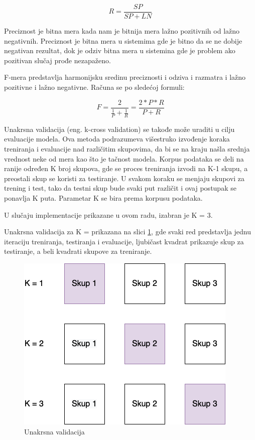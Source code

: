 \documentclass[12pt,oneside]{memoir}
\begin{document}
\begin{equation}
	R = \frac{SP}{SP+LN}
\end{equation}

Preciznost je bitna mera kada nam je bitnija mera lažno pozitivnih od lažno negativnih. Preciznost je bitna mera u sistemima gde je bitno da se ne dobije negativan rezultat, dok je odziv bitna mera u sistemina gde je problem ako pozitivan slučaj prođe nezapaženo.

F-mera predstavlja harmonijsku sredinu preciznosti i odziva i razmatra i lažno pozitivne i lažno negativne. Računa se po sledećoj formuli:

\begin{equation}
	F = \frac{2}{\frac{1}{P} + \frac{1}{R}} = \frac{2 * P * R }{P + R}
\end{equation}

Unakrsna validacija (eng.  k-cross validation) se takođe može uraditi u cilju evaluacije modela. Ova metoda podrazumeva višestruko izvođenje koraka treniranja i evaluacije nad različitim skupovima, da bi se na kraju našla srednja vrednost neke od mera kao što je tačnost modela. Korpus podataka se deli na ranije određen K broj skupova, gde se proces treniranja izvodi na K-1 skupu, a preostali skup se koristi za testiranje. U svakom koraku se menjaju skupovi za trening i test, tako da testni skup bude svaki put različit i ovaj postupak se ponavlja K puta. Parametar K se bira prema korpusu podataka.

U slučaju implementacije prikazane u ovom radu, izabran je K = 3.

Unakrsna validacija za K = prikazana na slici \ref{img:K_cross_validation}, gde svaki red predstavlja jednu iteraciju treniranja, testiranja i evaluacije, ljubičast kvadrat prikazuje skup za testiranje, a beli kvadrati skupove za treniranje.

\begin{figure}[h!]
\centering
\includegraphics[width=.7\textwidth]{images/K_cross_validation.png}
\caption{Unakrsna validacija}
\label{img:K_cross_validation}
\end{figure}
\end{document}
